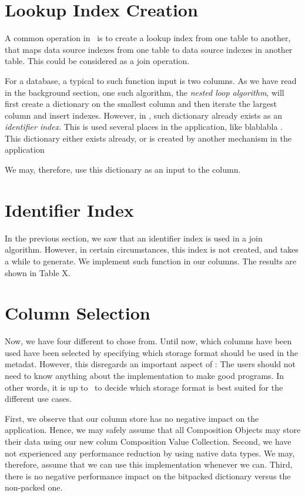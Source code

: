 \section{Lookup Index Creation}
\label{sec:Lookup Index Creation}
A common operation in \bd~is to create a lookup index from one table to another, that maps data source indexes from one table to data source indexes in another table. This could be considered as a join operation.

For a database, a typical to such function input is two columns. As we have read in the background section, one such algorithm, the \textit{nested loop algorithm}, will first create a dictionary on the smallest column and then iterate the largest column and insert indexes. However, in \gap, such dictionary already exists as an \textit{identifier index}. This is used several places in the application, like blablabla . This dictionary either exists already, or is created by another mechanism in the application

We may, therefore, use this dictionary as an input to the column.

\section{Identifier Index}
\label{sec:Identifier Index}
In the previous section, we saw that an identifier index is used in a join algorithm. However, in certain circumstances, this index is not created, and takes a while to generate. We implement such function in our columns. The results are shown in Table X.

\section{Column Selection}
\label{sec:Column Selection}
Now, we have four different  to chose from. Until now, which columns have been used have been selected by specifying which storage format should be used in the metadat. However, this disregards an important aspect of \mdd: The users should not need to know anything about the implementation to make good programs. In other words, it is up to \gap~to decide which storage format is best suited for the different use cases.

First, we observe that our column store has no negative impact on the application. Hence, we may safely assume that all Composition Objects may store their data using our new colum Composition Value Collection. Second, we have not experienced any performance reduction by using native data types. We may, therefore, assume that we can use this implementation whenever we can. Third, there is no negative performance impact on the bitpacked dictionary versus the non-packed one.

